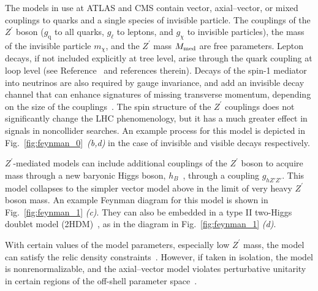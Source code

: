 \documentclass{ar-1col}
\newcommand{\chiDM}{\ensuremath{\chi}\xspace}
\newcommand{\IP}{invisible particle}
\newcommand{\mMed}{\ensuremath{M_{\rm{med}}}\xspace}
\newcommand{\mmed}{\mMed}
\newcommand{\gDM}{\ensuremath{g_{\chiDM}}\xspace}
\newcommand{\gl}{$g_{\ell}$\xspace}
\newcommand{\gq}{$g_{\mathrm{q}}$\xspace}
\newcommand{\mdm}{\ensuremath{m_{\chiDM}}\xspace}
\newcommand{\ghZprimeZprime}{\ensuremath{g_{hZ'Z'}}\xspace}
\newcommand{\Zprime}{\ensuremath{{Z}^\prime}\xspace}
\begin{document}
The models in use at ATLAS and CMS contain vector,
axial--vector, or mixed couplings to quarks and a single species of
{\IP}. The couplings of the \Zprime boson (\gq to all quarks, \gl to
leptons, and \gDM to {\IP}s), the mass of the invisible particle \mdm, and the
\Zprime mass \mmed are free parameters. Lepton decays, if not
included explicitly at tree level, arise through the quark
coupling at loop level (see Reference~ and
references therein). Decays of the spin-1 mediator into neutrinos
are also required by gauge invariance, and add an invisible decay
channel that can enhance signatures of missing transverse
momentum, depending on the size of the
couplings~\cite{Albert:2017onk}. The spin structure of the \Zprime
couplings does not significantly change the LHC phenomenology, but it
has a much greater effect in signals in noncollider searches.
An example process for this model is depicted in Fig.~\ref{fig:feynman_0}~\textit{(b,d)} in
the case of invisible and visible decays respectively.

\Zprime-mediated models can include additional couplings of the
\Zprime boson to acquire mass through a new baryonic Higgs boson,
$h_B$~\cite{Berlin:2014cfa}, through a coupling \ghZprimeZprime. 
This model collapses to the simpler vector model
above in the limit of very heavy \Zprime boson mass. 
An example Feynman diagram for this model is shown
in Fig.~\ref{fig:feynman_1} \textit{(c)}. 
They can also be
embedded in a type II two-Higgs doublet model
(2HDM)~\cite{Berlin:2014cfa}, as in the diagram in Fig.~\ref{fig:feynman_1} \textit{(d)}.

With certain values of the model parameters, especially low
\Zprime mass, the model can satisfy the relic density
constraints~\cite{Chala:2015ama}. However, if taken in isolation,
the model is nonrenormalizable, and the axial--vector model
violates perturbative unitarity in certain regions of the
off-shell parameter
space~\cite{Chala:2015ama,Kahlhoefer:2015bea,Boveia:2016mrp}.
\end{document}
